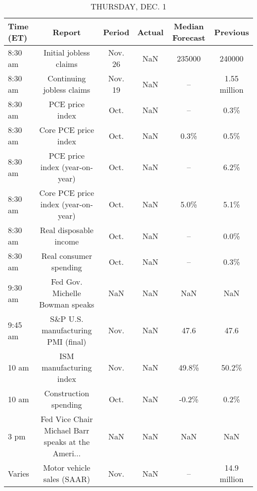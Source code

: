 \documentclass{article}%
\begin{document}
%


\begin{table}[htbp]%
\caption{THURSDAY, DEC. 1}%
\centering%
\begin{adjustbox}{width=1\textwidth}%
\begin{tabular}{lccccc}
\toprule
Time (ET) &                                             Report &  Period & Actual & Median Forecast &     Previous \\
\midrule
  8:30 am &                             Initial jobless claims & Nov. 26 &    NaN &          235000 &       240000 \\
  8:30 am &                          Continuing jobless claims & Nov. 19 &    NaN &              -- & 1.55 million \\
  8:30 am &                                    PCE price index &    Oct. &    NaN &              -- &         0.3\% \\
  8:30 am &                               Core PCE price index &    Oct. &    NaN &            0.3\% &         0.5\% \\
  8:30 am &                     PCE price index (year-on-year) &    Oct. &    NaN &              -- &         6.2\% \\
  8:30 am &                Core PCE price index (year-on-year) &    Oct. &    NaN &            5.0\% &         5.1\% \\
  8:30 am &                             Real disposable income &    Oct. &    NaN &              -- &         0.0\% \\
  8:30 am &                             Real consumer spending &    Oct. &    NaN &              -- &         0.3\% \\
  9:30 am &                    Fed Gov. Michelle Bowman speaks &     NaN &    NaN &             NaN &          NaN \\
  9:45 am &                 S\&P U.S. manufacturing PMI (final) &    Nov. &    NaN &            47.6 &         47.6 \\
    10 am &                            ISM manufacturing index &    Nov. &    NaN &           49.8\% &        50.2\% \\
    10 am &                              Construction spending &    Oct. &    NaN &           -0.2\% &         0.2\% \\
     3 pm & Fed Vice Chair Michael Barr speaks at the Ameri... &     NaN &    NaN &             NaN &          NaN \\
   Varies &                         Motor vehicle sales (SAAR) &    Nov. &    NaN &              -- & 14.9 million \\
\bottomrule
\end{tabular}
%
\end{adjustbox}%
\end{table}
\end{document}
